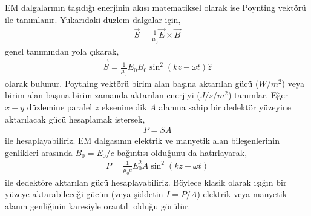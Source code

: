\documentclass[a4paper,12pt, twoside]{article}
\begin{document}
EM dalgalarının taşıdığı enerjinin akısı matematiksel olarak ise Poynting vektörü ile tanımlanır. Yukarıdaki düzlem dalgalar için,
\begin{align}
\label{eq:poynting_vec}
\vec S = \frac{1}{\mu_0}\vec E \times \vec B
\end{align}
genel tanımından yola çıkarak,
\begin{align}
\label{eq:poynting_plane_wave}
\vec S = \frac{1}{\mu_0} E_0 B_0 \sin^2(kz-\omega t)\hat z
\end{align}
olarak bulunur. Poything vektörü birim alan başına aktarılan gücü ($W/m^2$) veya birim alan başına birim zamanda aktarılan enerjiyi ($J/s/m^2$) tanımlar. Eğer $x-y$ düzlemine paralel $z$ eksenine dik $A$ alanına sahip bir dedektör yüzeyine aktarılacak gücü hesaplamak istersek,
\begin{align}
\label{eq:poynting_power1}
P = S A
\end{align}
ile hesaplayabiliriz. EM dalgasının elektrik ve manyetik alan bileşenlerinin genlikleri arasında $B_0 = E_0/c$ bağıntısı olduğunu da hatırlayarak,
\begin{align}
\label{eq:poynting_power2}
P = \frac{1}{\mu_0 c} E_0^2 A \sin^2(kz-\omega t)
\end{align}
ile dedektöre aktarılan gücü hesaplayabiliriz. Böylece klasik olarak ışığın bir yüzeye aktarabileceği gücün (veya şiddetin $I = P/A$) elektrik veya manyetik alanın genliğinin karesiyle orantılı olduğu görülür.
\end{document}
